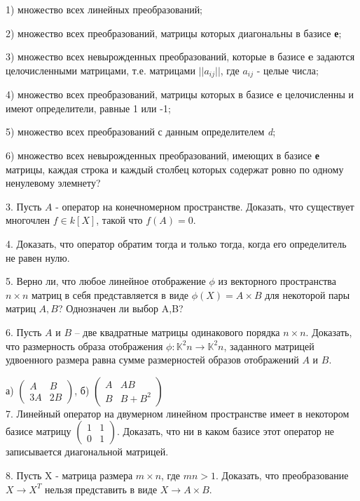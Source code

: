 \documentclass[12pt]{article}
\begin{document}
1) множество всех линейных преобразований;

2) множество всех преобразований, матрицы которых диагональны в базисе \textbf{е};

3) множество всех невырожденных преобразований, которые в базисе \textbf{e} задаются целочисленными матрицами, т.е. матрицами $||a_{ij}||$, где $a_{ij}$ - целые числа;

4) множество всех преобразований, матрицы которых в базисе \textbf{e} целочисленны и имеют определители, равные 1 или -1;

5) множество всех преобразований с данным определителем \textit{d};

6) множество всех невырожденных преобразований, имеющих в базисе \textbf{е} матрицы, каждая строка и каждый столбец которых содержат ровно по одному ненулевому элемнету?

3. Пусть $A$ - оператор на конечномерном пространстве. Доказать, что существует многочлен $f \in k[X]$, такой что $f(A) = 0$. 

4. Доказать, что оператор обратим тогда и только тогда, когда его определитель не равен нулю.

5. Верно ли, что любое линейное отображение $\phi$ из векторного пространства $n \times n$ матриц в себя представляется в виде $\phi(X) = A \times B$ для некоторой пары матриц $A, B$? Однозначен ли выбор A,B?

6. Пусть $A$ и $B$ – две квадратные матрицы одинакового порядка $n \times n$.
Доказать, что размерность образа отображения $\phi : \mathbb K^2n \to \mathbb K^2n$, заданного матрицей удвоенного размера равна сумме размерностей образов отображений $A$ и $B$.

а) $\begin{pmatrix}
A & B\\
3A & 2B
\end{pmatrix}$, 
б) $\begin{pmatrix}
A & AB\\
B & B + B^2
\end{pmatrix}$
\\

7. Линейный оператор на двумерном линейном пространстве имеет в некотором базисе матрицу $\begin{pmatrix}1&1\\0&1\end{pmatrix}$. Доказать, что ни в каком базисе этот оператор не записывается диагональной матрицей. 

8. Пусть X - матрица размера $m \times n$, где $mn > 1$. Доказать, что преобразование $X \to X^T$ нельзя представить в виде $X \to A \times B$.
\end{document}
